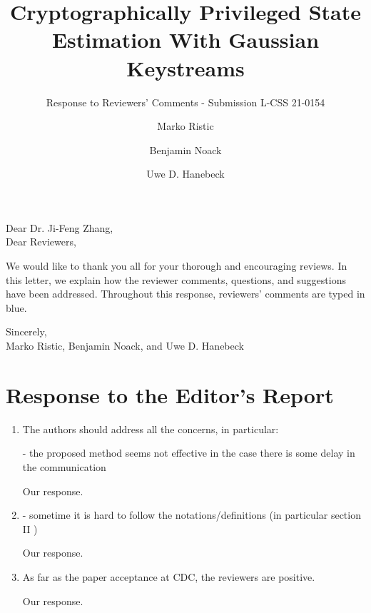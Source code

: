 \documentclass[a4paper]{scrartcl}
\title{\boldmath Cryptographically Privileged State Estimation With Gaussian Keystreams}
\subtitle{Response to Reviewers' Comments - Submission L-CSS 21-0154}
\author{Marko Ristic\and Benjamin Noack\and Uwe D. Hanebeck}
\newenvironment{rebuttal}{\begin{enumerate}[label={\color{grey}\thesection.\arabic{enumi}},leftmargin=0pt,ref=\thesection.\arabic{enumi}]}{\end{enumerate}}
\newcommand{\reviewtext}[1]{{\color{nblue} #1}}
\begin{document}
\maketitle

Dear Dr. Ji-Feng Zhang,\\
Dear Reviewers,

We would like to thank you all for your thorough and encouraging reviews. In this letter, we explain how the reviewer comments, questions, and suggestions have been addressed. Throughout this response, reviewers' comments are typed in \reviewtext{blue}. 

Sincerely,\\
Marko Ristic, Benjamin Noack, and Uwe D. Hanebeck




\section*{Response to the Editor's Report}
\def\thesection{E}
\begin{rebuttal} %
\item \reviewtext{The authors should address all the concerns, in particular:

- the proposed method seems not effective in the case there is some delay in the communication}

Our response.

\item \reviewtext{- sometime it is hard to follow the  notations/definitions (in particular section II )}

Our response.

\item \reviewtext{As far as the paper acceptance at CDC, the reviewers are positive.}

Our response.

\end{rebuttal}

\end{document}

